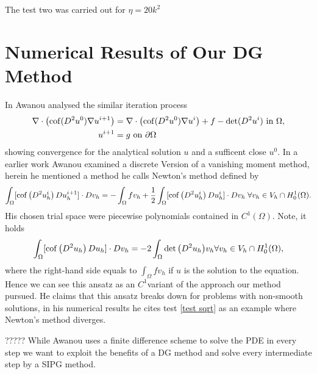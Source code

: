 
The test two was carried out for $\eta=20k^2$


\newpage

\section{Numerical Results of Our DG Method}


In \cite{Awanou2014} Awanou analysed the similar iteration process
\begin{align}
	\nabla \cdot \left( \operatorname{cof}(D^2 u^0) \nabla u^{i+1} \right) &= \nabla \cdot \left( \operatorname{cof}(D^2 u^0) \nabla u^{i} \right) + f - \operatorname{det} (D^2u^i) \textnormal{ in } \Omega,  \label{eq: Awanout eq}\\
	u^{i+1} &= g \textnormal{ on } \partial \Omega 
\end{align}
showing convergence for the analytical solution $u$ and a sufficent close $u^0$. 
In a earlier work \cite{Awanou2010} Awanou examined a discrete Version of a vanishing moment method, herein he mentioned a method he calls Newton's method defined by
\[
	\int_{\Omega} [\operatorname{cof} \left(  D^2 u_h^i \right) Du_h^{i+1}] \cdot Dv_h = -	\int_{\Omega} f v_h + \frac 1 2 \int_{\Omega} [\operatorname{cof} \left(  D^2 u_h^i \right) Du_h^{i}] \cdot Dv_h \; \forall v_h \in V_h \cap H^1_0 (\Omega)  \label{eq: Awanout eq2}.
\]
His chosen trial space were piecewise polynomials contained in $C^1(\Omega)$. Note, it holds 
\[\int_{\Omega}[\operatorname{cof} \left(  D^2 u_h \right) Du_h] \cdot Dv_h 
= -2 \int_\Omega \det{\left(D^2 u_h\right)} v_h \forall v_h \in V_h \cap H^1_0 (\Omega) ,
\]
where the right-hand side equals to $\int_\Omega f v_h$ if $u$ is the solution to the \MA equation. Hence we can see this ansatz as an $C^1$variant of the approach our method pursued.
He claims that this ansatz breaks down for problems with non-smooth solutions, in his numerical results he cites test \ref{test sqrt} as an example where Newton's method diverges.


?????
While Awanou uses a finite difference scheme to solve the PDE in every step we want to exploit the benefits of a DG method and solve every intermediate step by a SIPG method. 
